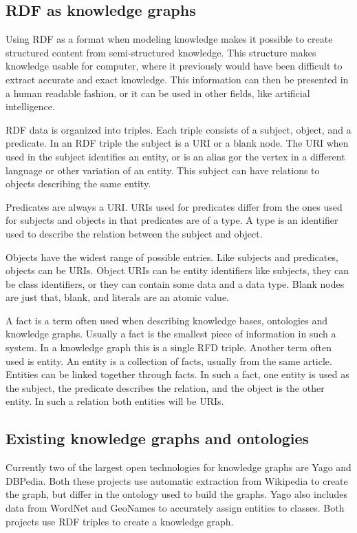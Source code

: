 \subsection{RDF as knowledge graphs}
Using RDF as a format when modeling knowledge makes it possible to create structured content from semi-structured knowledge. This structure makes knowledge usable for computer, where it previously would have been difficult to extract accurate and exact knowledge. This information can then be presented in a human readable fashion, or it can be used in other fields, like artificial intelligence.

RDF data is organized into triples. Each triple consists of a subject, object, and a predicate. In an RDF triple the subject is a URI or a blank node. The URI when used in the subject identifies an entity, or is an alias gor the vertex in a different language or other variation of an entity. This subject can have relations to objects describing the same entity.

Predicates are always a URI. URIs used for predicates differ from the ones used for subjects and objects in that predicates are of a type. A type is an identifier used to describe the relation between the subject and object.

Objects have the widest range of possible entries. Like subjects and predicates, objects can be URIs. Object URIs can be entity identifiers like subjects, they can be class identifiers, or they can contain some data and a data type. Blank nodes are just that, blank, and literals are an atomic value. 

A fact is a term often used when describing knowledge bases, ontologies and knowledge graphs. Usually a fact is the smallest piece of information in such a system. In a knowledge graph this is a single RFD triple. Another term often used is entity. An entity is a collection of facts, usually from the same article. Entities can be linked together through facts. In such a fact, one entity is used as the subject, the predicate describes the relation, and the object is the other entity. In such a relation both entities will be URIs.

\subsection{Existing knowledge graphs and ontologies}
Currently two of the largest open technologies for knowledge graphs are Yago and DBPedia. Both these projects use automatic extraction from Wikipedia to create the graph, but differ in the ontology used to build the graphs. Yago also includes data from WordNet and GeoNames to accurately assign entities to classes. Both projects use RDF triples to create a knowledge graph.

